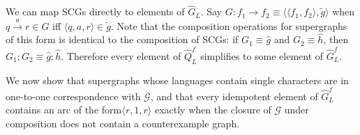 \documentclass{LMCS}
\newcommand{\zug}[1]{\langle #1  \rangle}
\newcommand{\rzug}[1]{{\scriptstyle\langle} #1  {\scriptstyle\rangle}}
\newcommand\vararrow[1]{\stackrel{#1}{\rightarrow}}
\newcommand{\G}{{\mathcal G}}
\renewcommand{\graph}{\widetilde}
\newcommand{\superg}{\widehat}
\newcommand{\supergFD}{\superg{Q}_L}
\begin{document}
We can map SCGs directly to elements of $\superg{G}_L$.  Say $G : f_1
\rightarrow f_2 \equiv \zug{\rzug{f_1,f_2}, \graph{g}}$ when $q \vararrow{a} r
\in G$ iff $\zug{q,a,r} \in \graph{g}$. Note that the composition operations for
supergraphs of this form is identical to the composition of SCGs: if $G_1 \equiv
\superg{g}$ and $G_2 \equiv \superg{h}$, then $G_1;G_2 \equiv
\superg{g};\superg{h}$.  Therefore every element of $\supergFD^f$ simplifies to
some element of $\superg{G}_L^f$.

We now show that supergraphs whose languages contain single characters are in
one-to-one correspondence with $\G$, and that every idempotent element of
$\superg{G}_L^f$ contains an arc of the form$\zug{r,1,r}$ exactly when the
closure of $\G$ under composition does not contain a counterexample graph. 
\end{document}
